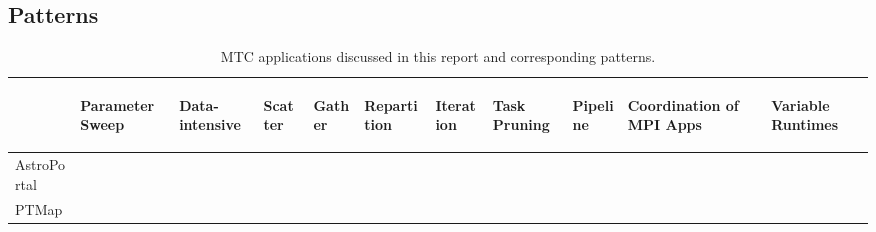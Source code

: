 \documentclass[10pt,letterpaper]{article}
\begin{document}
\subsection{Patterns\label{section:patterns}}


\begin{table}[t]
    \caption {MTC applications discussed in this report and corresponding patterns.  }
    \label{MTCAppsStats}
    \center
    { \footnotesize \renewcommand{\tabcolsep}{3pt}
    \begin{tabular}{|m{3.5cm}||>{\centering\arraybackslash}m{0.5cm}|>{\centering\arraybackslash}m{0.5cm}|>{\centering\arraybackslash}m{0.5cm}|>{\centering\arraybackslash}m{0.5cm}|>{\centering\arraybackslash}m{0.5cm}|>{\centering\arraybackslash}m{0.5cm}|>{\centering\arraybackslash}m{0.5cm}|>{\centering\arraybackslash}m{0.5cm}|>{\centering\arraybackslash}m{0.5cm}|>{\centering\arraybackslash}m{0.5cm}|}
            \hline
                        &\begin{sideways} Parameter Sweep  \end{sideways} & \begin{sideways}Data-intensive \end{sideways}& \begin{sideways}Scatter \end{sideways}  & \begin{sideways}Gather  \end{sideways} & \begin{sideways}Repartition \end{sideways}  & \begin{sideways}Iteration \end{sideways}	& \begin{sideways}Task Pruning \end{sideways} & \begin{sideways}Pipeline \end{sideways} & \begin{sideways} {\space Coordination of MPI Apps \space} \end{sideways}	& \begin{sideways}Variable Runtimes \end{sideways}\\
            \hline \hline
    AstroPortal	        &	            &{$\times$}	    &	        &	    &	            &	        &	        &	    &	                        &\\
            \hline
    PTMap	        &	            &{$\times$}	    &{$\times$} &{$\times$} &               &	        &	        &{$\times$} &	                        &\\

\end{tabular}}
\end{table}
\end{document}
